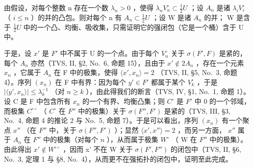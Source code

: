 由假设，对每个整数 n 存在一个数 \(\lambda_{n}>0\) ，使得 \(\lambda_{n}V_{n}^{\circ}\subset\frac{1}{2}U\) ；设 \(A_{n}\) 是诸 \(\lambda_{i}V_{i}^{\circ}\) （ \(i\leqslant n\) ）的并的凸包。则对每个 n 有 \(A_{n}\subset\frac{1}{2}U\) ；设 W 是诸 \(A_{n}\) 的并； W 是含于 \(\frac{1}{2}U\) 中的一个凸、均衡、吸收集，只需证明它的强闭包（它是一个桶）含于 U 中。

于是，设 \(x'\) 是 \(F'\) 中不属于 U 的一个点。由于每个 \(V_n^\circ\) 关于 \(\sigma(F', F)\) 是紧的，每个 \(A_n\) 亦然（TVS, II, §2, No.~6, 命题 15），且由于 \(x' \notin 2A_n\) ，存在一个元素 \(x_n\) ，它属于 \(A_n\) 在 F 中的极集，使得 \(\langle x', x_n \rangle = 2\) （TVS, II, §5, No.~3, 命题 4）。序列 \((x_n)\) 在 F 中有界：因为每个 \(y' \in F'\) 都属于某个 \(V_k^\circ\) ，于是 \(|\langle y', x_n \rangle| \leqslant \lambda_k^{-1}\) （对 \(n \geqslant k\) ），由此得我们的断言（TVS, IV, §1, No.~1, 命题 1）。设 C 是 F 中包含所有 \(x_n\) 的一个有界、均衡凸集；则 \(C^\circ\) 是 \(F'\) 中 0 的一个邻域，而极集 \(C^{\circ\circ}\) （ \(C^\circ\) 在 \(F''\) 中的极集）关于 \(\sigma(F'', F')\) 是紧的（TVS, III, §3, No.~4, 命题 4 的推论 2 与 No.~5, 命题 7）。于是可以看出，序列 \((x_n)\) 有一个聚点 \(x''\) （在 \(F''\) 中，关于 \(\sigma(F'', F')\) ）；显然 \(\langle x', x'' \rangle = 2\) ，而另一方面， \(x''\) 属于 \(A_n\) 在 \(F''\) 中的极集（对每个 \(n\) ），从而属于极集 \(W^\circ\) （ W 在 \(F''\) 中的极集）。由此得出 \(x' \notin W^{\circ\circ}\) ，因而 x' 不在 W 关于 \(\sigma(F', F'')\) 的闭包中（TVS, II, §6, No.~3, 定理 1 与 §8, No.~4），从而更不在强拓扑的闭包中，证明至此完成。
\relax{}
